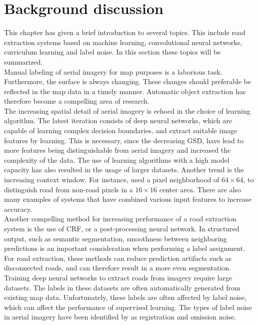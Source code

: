 \section{Background discussion}
\label{sec:backgroundDiscussion}
This chapter has given a brief introduction to several topics. This include  road extraction systems based on machine learning, convolutional neural networks, curriculum learning and label noise. In this section these topics will be summarized. \\

Manual labeling of aerial imagery for map purposes is a laborious task. Furthermore, the surface is always changing. These changes should preferable be reflected in the map data in a timely manner. Automatic object extraction has therefore become a compelling area of research.\\

The increasing spatial detail of aerial imagery is echoed in the choice of learning algorithm. The latest iteration consists of deep neural networks, which are capable of learning complex decision boundaries, and extract suitable image features by learning. This is necessary, since the decreasing \ac{GSD}, have  lead to more features being distinguishable from aerial imagery and increased the complexity of the data. The use of learning algorithms with a high model capacity has also resulted in the usage of larger datasets. Another trend is the increasing context window. For instance, \cite{Mnih_roads_high_res_aerial_images} used a pixel neighborhood of $64 \times 64$, to distinguish road from non-road pixels in a $16 \times 16$   center area. There are also many examples of systems that have combined various input features to increase accuracy.\\

Another compelling method for increasing performance of a road extraction system is the use of \ac{CRF}, or a post-processing neural network. In structured output, such as semantic segmentation,  smoothness between neighboring predictions is an important consideration when performing a label assignment. For road extraction, these methods can reduce prediction artifacts such as disconnected roads, and can therefore result in a more even segmentation.\\

Training deep neural networks to extract roads from imagery require large datasets. The labels in these datasets are often automatically generated from existing map data. Unfortunately, these labels are often affected by label noise, which can affect the performance of supervised learning. The types of label noise in aerial imagery have been identified by \cite{Mnih_aerial_images_noisy} as registration and omission noise.  \\

